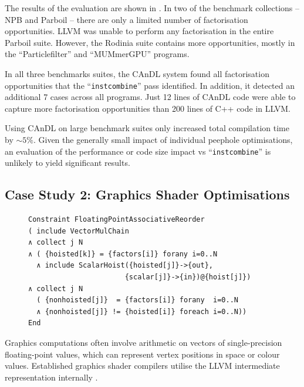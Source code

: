     The results of the evaluation are shown in
    .
    In two of the benchmark collections -- NPB and Parboil -- there are
    only a limited number of factorisation opportunities.
    LLVM was unable to perform any factorisation in the entire Parboil suite.
    However, the Rodinia suite contains more opportunities, mostly in the
    ``Particlefilter'' and ``MUMmerGPU'' programs.

    In all three benchmarks suites, the CAnDL system found all factorisation
    opportunities that the ``\texttt{instcombine}'' pass identified.
    In addition, it detected an additional 7 cases across all programs.
    Just 12 lines of CAnDL code were able to capture more factorisation
    opportunities than 200 lines of C++ code in LLVM.

    Using CAnDL on large benchmark suites only increased total compilation time
    by ${\sim}5\%$.
    Given the generally small impact of individual peephole optimisations, an
    evaluation of the performance or code size impact vs ``{\tt instcombine}''
    is unlikely to yield significant results.

\subsection{Case Study 2: Graphics Shader Optimisations}

\begin{figure}[t]
\begin{lstlisting}[language=CAnDL,label={fig:Lewis},caption=
   {CAnDL defines multiplication chains with genuine vectors and hoisted
    scalars:
    After separating the two cases, some of the multiplications can be performed
    on scalars instead.}]
Constraint FloatingPointAssociativeReorder
( include VectorMulChain
∧ collect j N
∧ ( {hoisted[k]} = {factors[i]} forany i=0..N
  ∧ include ScalarHoist({hoisted[j]}->{out},
                       {scalar[j]}->{in})@{hoist[j]})
∧ collect j N
  ( {nonhoisted[j]}  = {factors[i]} forany  i=0..N
  ∧ {nonhoisted[j]} != {hoisted[i]} foreach i=0..N))
End
\end{lstlisting}
\end{figure}

    Graphics computations often involve arithmetic on vectors of
    single-precision floating-point values, which can represent vertex positions
    in space or colour values.
    Established graphics shader compilers utilise the LLVM intermediate
    representation internally \citep{cudacompiler}.

